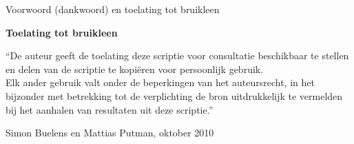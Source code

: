   Voorwoord (dankwoord) en toelating tot bruikleen







\noindent \textbf{\huge Toelating tot bruikleen}

\vspace{1.5cm}

\noindent
``De auteur geeft de toelating deze scriptie voor consultatie beschikbaar
te stellen en delen van de scriptie te kopi\"eren voor persoonlijk
gebruik.\\
Elk ander gebruik valt onder de beperkingen van het auteursrecht,
in het bijzonder met betrekking tot de verplichting de bron uitdrukkelijk
te vermelden bij het aanhalen van resultaten uit deze scriptie.''

\addvspace{4cm}

\noindent Simon Buelens en Mattias Putman, oktober 2010
